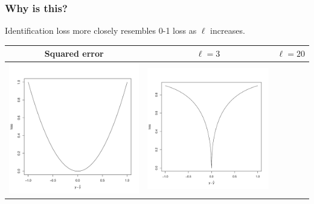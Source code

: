 \documentclass{beamer}
\begin{document}
\begin{frame}
\frametitle{Why is this?}
Identification loss more closely resembles 0-1 loss as $\ell$ increases.
\begin{center}
\begin{tabular}{c|c|c}
Squared error & $\ell = 3$ & $\ell = 20$\\ \hline
\includegraphics[scale = 0.2]{loss_se.pdf} &
\includegraphics[scale = 0.2]{loss_3.pdf} &

\end{tabular}
\end{center}
\end{frame}
\end{document}
